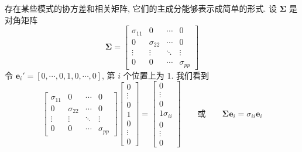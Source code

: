 存在某些模式的协方差和相关矩阵, 它们的主成分能够表示成简单的形式. 设 $\boldsymbol{\Sigma}$ 是对角矩阵
\label{eq:8-13}
\begin{equation}
\boldsymbol{\Sigma}=\begin{bmatrix}\sigma_{11}&0&\cdots&0\\0&\sigma_{22}&\cdots&0\\\vdots&\vdots&\ddots&\vdots\\0&0&\cdots&\sigma_{pp}\end{bmatrix}
\tag{8-13}
\end{equation}
令 $\mathbf{e}_i'=[0,\cdots,0,1,0,\cdots,0]$, 第 $i$ 个位置上为 1. 我们看到
\[
\begin{bmatrix}\sigma_{11}&0&\cdots&0\\0&\sigma_{22}&\cdots&0\\\vdots&\vdots&\ddots&\vdots\\0&0&\cdots&\sigma_{pp}\end{bmatrix}
\begin{bmatrix}0\\\vdots\\0\\1\\0\\\vdots\\0\end{bmatrix}=
\begin{bmatrix}0\\\vdots\\0\\1\sigma_{ii}\\0\\\vdots\\0\end{bmatrix}
\qquad\text{或}\qquad
\boldsymbol{\Sigma}\mathbf{e}_i=\sigma_{ii}\mathbf{e}_i
\]
